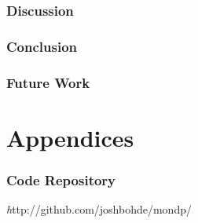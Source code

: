 \documentclass[11pt, oneside, notitlepage, draft]{article}
\begin{document}
\section{Discussion}

\section{Conclusion}

\section{Future Work}

\clearpage
\appendix
\part*{Appendices}
\section{Code Repository}
{\emph http://github.com/joshbohde/mondp/}
\end{document}
